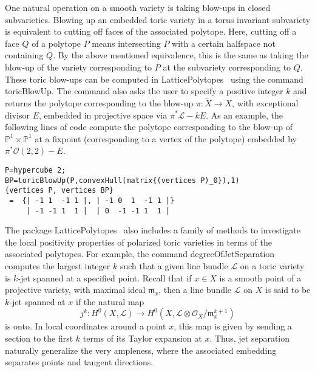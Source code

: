 \documentclass{amsart}
\begin{document}
One natural operation on a smooth variety is taking blow-ups in closed subvarieties. Blowing up an embedded toric variety in a torus invariant subvariety is equivalent to cutting off faces of the associated polytope. Here, cutting off a face $Q$ of a polytope $P$ means intersecting $P$ with a certain halfspace not containing $Q$. By the above mentioned equivalence, this is the same as taking the blow-up of the variety corresponding to $P$ at the subvariety corresponding to $Q$. 
These toric blow-ups can be computed in {\textsf{LatticePolytopes}\ } using the command \textsf{toricBlowUp}. The command also asks the user to specify a positive integer $k$ and returns the polytope corresponding to the blow-up $\pi\colon\widetilde{X} \to X$, with exceptional divisor $E$, embedded in projective space via $\pi^*{\mathscr{L}}-kE$.  As an example, the following lines of code compute the polytope corresponding to the blow-up of ${\mathbb{P}}^1\times {\mathbb{P}}^1$ at a fixpoint (corresponding to a vertex of the polytope) embedded by $\pi^*{\mathscr{O}}(2,2)-E$.
\begin{verbatim}
P=hypercube 2;
BP=toricBlowUp(P,convexHull(matrix{(vertices P)_0}),1)
{vertices P, vertices BP}
 =  {| -1 1  -1 1 |, | -1 0  1  -1 1 |}
     | -1 -1 1  1 |  | 0  -1 -1 1  1 |
\end{verbatim}

The package {\textsf{LatticePolytopes}\ } also includes a family of methods to investigate the local positivity properties of polarized toric varieties in terms of the associated polytopes. For example, the command \textsf{degreeOfJetSeparation} computes the largest integer $k$ such that a given line bundle ${\mathscr{L}}$ on a toric variety is $k$-jet spanned at a specified point. Recall that if $x\in X$ is a smooth point of a projective variety, with maximal ideal $\mathfrak{m}_x$, then a line bundle ${\mathscr{L}}$ on $X$ is said to be $k$-jet spanned at $x$ if the natural map 
\[j^k\colon H^0(X,{\mathscr{L}})\rightarrow H^0(X,{\mathscr{L}}\otimes {\mathscr{O}}_{X}/\mathfrak{m}_x^{k+1})\]
 is onto. In local coordinates around a point $x$, this map is given by sending a section to the first $k$ terms of its Taylor expansion at $x$. Thus, jet separation naturally generalize the very ampleness, where the associated embedding separates points and tangent directions. 
\end{document}
